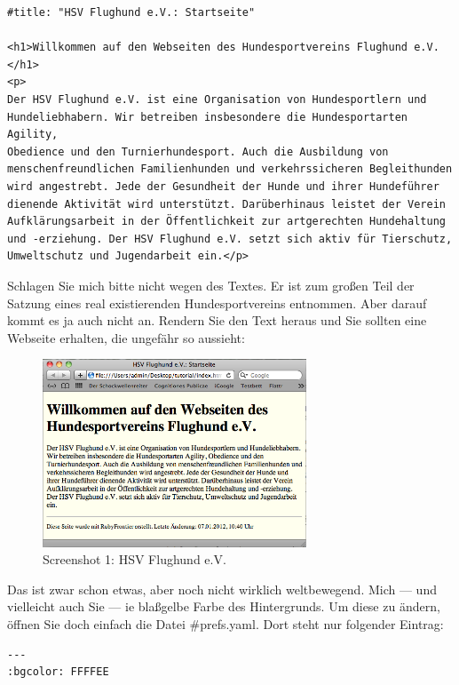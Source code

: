 \documentclass[11pt]{report}
\begin{document}
\begin{verbatim}
#title: "HSV Flughund e.V.: Startseite"

<h1>Willkommen auf den Webseiten des Hundesportvereins Flughund e.V.</h1>
<p>
Der HSV Flughund e.V. ist eine Organisation von Hundesportlern und
Hundeliebhabern. Wir betreiben insbesondere die Hundesportarten Agility,
Obedience und den Turnierhundesport. Auch die Ausbildung von
menschenfreundlichen Familienhunden und verkehrssicheren Begleithunden
wird angestrebt. Jede der Gesundheit der Hunde und ihrer Hundeführer
dienende Aktivität wird unterstützt. Darüberhinaus leistet der Verein
Aufklärungsarbeit in der Öffentlichkeit zur artgerechten Hundehaltung
und -erziehung. Der HSV Flughund e.V. setzt sich aktiv für Tierschutz,
Umweltschutz und Jugendarbeit ein.</p>
\end{verbatim}

Schlagen Sie mich bitte nicht wegen des Textes. Er ist zum großen Teil
der Satzung eines real existierenden Hundesportvereins entnommen. Aber
darauf kommt es ja auch nicht an. Rendern Sie den Text heraus und Sie
sollten eine Webseite erhalten, die ungefähr so aussieht:

\begin{figure}[h!]
\centering
\includegraphics[width=0.7\textwidth]{./images/flughund01.png}
\caption{\label{flughund01}Screenshot 1: HSV Flughund e.V.}
\end{figure}


Das ist zwar schon etwas, aber noch nicht wirklich weltbewegend. Mich
— und vielleicht auch Sie — ie blaßgelbe Farbe des
Hintergrunds. Um diese zu ändern, öffnen Sie doch einfach die
Datei \#prefs.yaml. Dort steht nur folgender Eintrag:


\begin{verbatim}
--- 
:bgcolor: FFFFEE
\end{verbatim}
\end{document}
